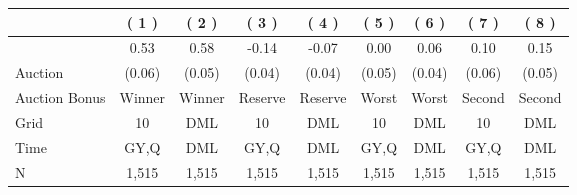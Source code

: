 
\begin{tabular}{lcccccccc}
\toprule
 & ( 1 ) & ( 2 ) & ( 3 ) & ( 4 ) & ( 5 ) & ( 6 ) & ( 7 ) & ( 8 )\\
\midrule
 & 0.53 & 0.58 & -0.14 & -0.07 & 0.00 & 0.06 & 0.10 & 0.15\\

\multirow{-2}{*}{\raggedright\arraybackslash Auction} & (0.06) & (0.05) & (0.04) & (0.04) & (0.05) & (0.04) & (0.06) & (0.05)\\

\midrule
Auction Bonus & Winner & Winner & Reserve & Reserve & Worst & Worst & Second & Second\\

Grid & 10 & DML & 10 & DML & 10 & DML & 10 & DML\\

Time & GY,Q & DML & GY,Q & DML & GY,Q & DML & GY,Q & DML\\
\midrule

N & 1,515 & 1,515 & 1,515 & 1,515 & 1,515 & 1,515 & 1,515 & 1,515\\
\bottomrule
\end{tabular}
